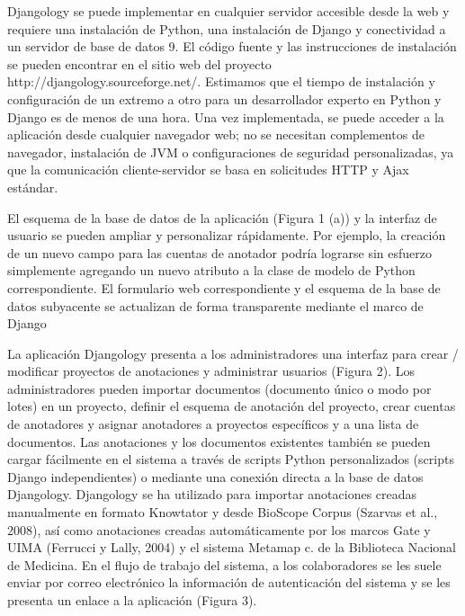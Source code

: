 \begin{description}
Djangology se puede implementar en cualquier servidor accesible desde la web y requiere una instalación de Python, una instalación de Django y conectividad a un servidor de base de datos 9. El código fuente y las instrucciones de instalación se pueden encontrar en el sitio web del proyecto http://djangology.sourceforge.net/. Estimamos que el tiempo de instalación y configuración de un extremo a otro para un desarrollador experto en Python y Django es de menos de una hora. Una vez implementada, se puede acceder a la aplicación desde cualquier navegador web; no se necesitan complementos de navegador, instalación de JVM o configuraciones de seguridad personalizadas, ya que la comunicación cliente-servidor se basa en solicitudes HTTP y Ajax estándar.

El esquema de la base de datos de la aplicación (Figura 1 (a)) y la interfaz de usuario se pueden ampliar y personalizar rápidamente. Por ejemplo, la creación de un nuevo campo para las cuentas de anotador podría lograrse sin esfuerzo simplemente agregando un nuevo atributo a la clase de modelo de Python correspondiente. El formulario web correspondiente y el esquema de la base de datos subyacente se actualizan de forma transparente mediante el marco de Django

La aplicación Djangology presenta a los administradores una interfaz para crear / modificar proyectos de anotaciones y administrar usuarios (Figura 2). Los administradores pueden importar documentos (documento único o modo por lotes) en un proyecto, definir el esquema de anotación del proyecto, crear cuentas de anotadores y asignar anotadores a proyectos específicos y a una lista de documentos. Las anotaciones y los documentos existentes también se pueden cargar fácilmente en el sistema a través de scripts Python personalizados (scripts Django independientes) o mediante una conexión directa a la base de datos Djangology. Djangology se ha utilizado para importar anotaciones creadas manualmente en formato Knowtator y desde BioScope Corpus (Szarvas et al., 2008), así como anotaciones creadas automáticamente por los marcos Gate y UIMA (Ferrucci y Lally, 2004) y el sistema Metamap c. de la Biblioteca Nacional de Medicina. En el flujo de trabajo del sistema, a los colaboradores se les suele enviar por correo electrónico la información de autenticación del sistema y se les presenta un enlace a la aplicación (Figura 3).


\end{description}
